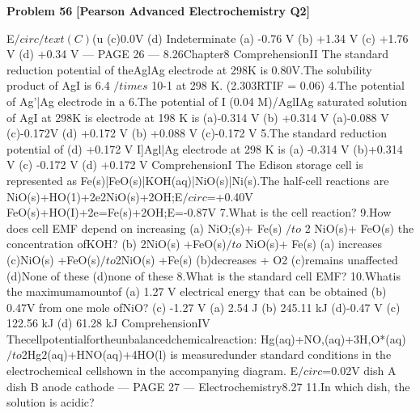 \begin{problembox}
\textbf{Problem 56} \hfill \textbf{[Pearson Advanced Electrochemistry Q2]}
\label{q:ext-pearson-56}

E$/circ/text(C)$(u
(c)0.0V
(d) Indeterminate
(a) -0.76 V
(b) +1.34 V
(c) +1.76 V
(d) +0.34 V
--- PAGE 26 ---
8.26Chapter8
ComprehensionII
The standard reduction potential of theAglAg electrode at 298K is 0.80V.The solubility product of
AgI is 6.4 $/times$ 10-1 at 298 K. (2.303RTIF = 0.06)
4.The potential of Ag'|Ag electrode in a
6.The potential of I (0.04 M)/AglIAg
saturated solution of AgI at 298K is
electrode at 198 K is
(a)-0.314 V
(b) +0.314 V
(a)-0.088 V
(c)-0.172V
(d) +0.172 V
(b) +0.088 V
(c)-0.172 V
5.The standard reduction potential of
(d) +0.172 V
I]Agl|Ag electrode at 298 K is
(a) -0.314 V
(b)+0.314 V
(c) -0.172 V
(d) +0.172 V
ComprehensionI
The Edison storage cell is represented as Fe(s)|FeO(s)|KOH(aq)|NiO(s)|Ni(s).The half-cell
reactions are
NiO(s)+HO(1)+2e2NiO(s)+2OH;E$/circ$=+0.40V
FeO(s)+HO(I)+2e=Fe(s)+2OH;E=-0.87V
7.What is the cell reaction?
9.How does cell EMF depend on increasing
(a) NiO;(s)+ Fe(s) $/to$ 2 NiO(s)+ FeO(s)
the concentration ofKOH?
(b) 2NiO(s) +FeO(s)$/to$ NiO(s)+ Fe(s)
(a) increases
(c)NiO(s) +FeO(s)$/to$2NiO(s) +Fe(s)
(b)decreases
+ O2
(c)remains unaffected
(d)None of these
(d)none of these
8.What is the standard cell EMF?
10.Whatis the maximumamountof
(a) 1.27 V
electrical energy that can be obtained
(b) 0.47V
from one mole ofNiO?
(c) -1.27 V
(a) 2.54 J
(b) 245.11 kJ
(d)-0.47 V
(c) 122.56 kJ
(d) 61.28 kJ
ComprehensionIV
Thecellpotentialfortheunbalancedchemicalreaction:
Hg(aq)+NO,(aq)+3H,O*(aq)$/to$2Hg$2$(aq)+HNO(aq)+4HO(l)
is measuredunder standard conditions in the electrochemical cellshown in the accompanying diagram.
E$/circ$=0.02V
dish A
dish B
anode
cathode
--- PAGE 27 ---
Electrochemistry8.27
11.In which dish, the solution is acidic?
\end{problembox}

